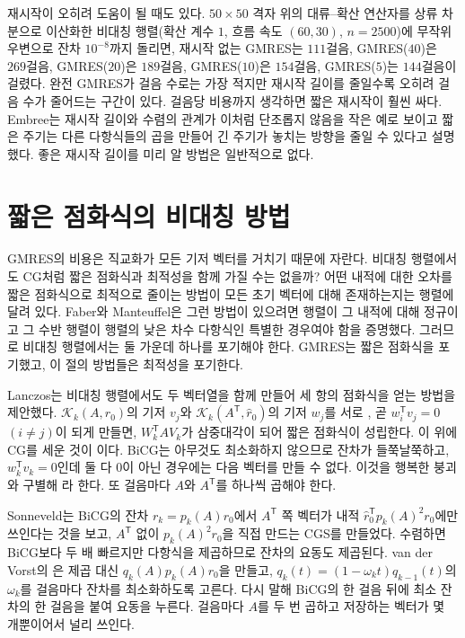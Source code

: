 재시작이 오히려 도움이 될 때도 있다. $50\times50$ 격자 위의 대류--확산 연산자를 상류 차분으로 이산화한 비대칭 행렬(확산 계수 $1$, 흐름 속도 $(60,30)$, $n=2500$)에 무작위 우변으로 잔차 $10^{-8}$까지 돌리면, 재시작 없는 GMRES는 $111$걸음, GMRES($40$)은 $269$걸음, GMRES($20$)은 $189$걸음, GMRES($10$)은 $154$걸음, GMRES($5$)는 $144$걸음이 걸렸다. 완전 GMRES가 걸음 수로는 가장 적지만 재시작 길이를 줄일수록 오히려 걸음 수가 줄어드는 구간이 있다. 걸음당 비용까지 생각하면 짧은 재시작이 훨씬 싸다. Embree는 재시작 길이와 수렴의 관계가 이처럼 단조롭지 않음을 작은 예로 보이고 짧은 주기는 다른 다항식들의 곱을 만들어 긴 주기가 놓치는 방향을 줄일 수 있다고 설명했다\cite{embree2003tortoise}. 좋은 재시작 길이를 미리 알 방법은 일반적으로 없다.

\section{짧은 점화식의 비대칭 방법}
\label{sec:bicg}

GMRES의 비용은 직교화가 모든 기저 벡터를 거치기 때문에 자란다. 비대칭 행렬에서도 CG처럼 짧은 점화식과 최적성을 함께 가질 수는 없을까? 어떤 내적에 대한 오차를 짧은 점화식으로 최적으로 줄이는 방법이 모든 초기 벡터에 대해 존재하는지는 행렬에 달려 있다. Faber와 Manteuffel은 그런 방법이 있으려면 행렬이 그 내적에 대해 정규이고 그 수반 행렬이 행렬의 낮은 차수 다항식인 특별한 경우여야 함을 증명했다\cite{faber1984}. 그러므로 비대칭 행렬에서는 둘 가운데 하나를 포기해야 한다. GMRES는 짧은 점화식을 포기했고, 이 절의 방법들은 최적성을 포기한다.

Lanczos는 비대칭 행렬에서도 두 벡터열을 함께 만들어 세 항의 점화식을 얻는 방법을 제안했다. $\mathcal K_k(A,r_0)$의 기저 $v_j$와 $\mathcal K_k(A^{\mathsf T},\hat r_0)$의 기저 $w_j$를 서로 , 곧 $w_i^{\mathsf T}v_j=0$ $(i\ne j)$이 되게 만들면, $W_k^{\mathsf T}AV_k$가 삼중대각이 되어 짧은 점화식이 성립한다. 이 위에 CG를 세운 것이 이다\cite{fletcher1976}. BiCG는 아무것도 최소화하지 않으므로 잔차가 들쭉날쭉하고, $w_k^{\mathsf T}v_k=0$인데 둘 다 $0$이 아닌 경우에는 다음 벡터를 만들 수 없다. 이것을 행복한 붕괴와 구별해 라 한다. 또 걸음마다 $A$와 $A^{\mathsf T}$를 하나씩 곱해야 한다.

Sonneveld는 BiCG의 잔차 $r_k=p_k(A)r_0$에서 $A^{\mathsf T}$ 쪽 벡터가 내적 $\hat r_0^{\mathsf T}p_k(A)^2r_0$에만 쓰인다는 것을 보고, $A^{\mathsf T}$ 없이 $p_k(A)^2r_0$을 직접 만드는 CGS를 만들었다\cite{sonneveld1989}. 수렴하면 BiCG보다 두 배 빠르지만 다항식을 제곱하므로 잔차의 요동도 제곱된다. van der Vorst의 은 제곱 대신 $q_k(A)p_k(A)r_0$을 만들고, $q_k(t)=(1-\omega_kt)q_{k-1}(t)$의 $\omega_k$를 걸음마다 잔차를 최소화하도록 고른다\cite{vandervorst1992}. 다시 말해 BiCG의 한 걸음 뒤에 최소 잔차의 한 걸음을 붙여 요동을 누른다. 걸음마다 $A$를 두 번 곱하고 저장하는 벡터가 몇 개뿐이어서 널리 쓰인다.

